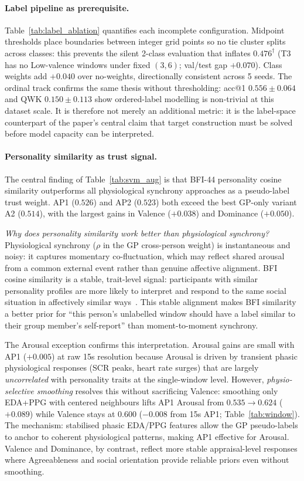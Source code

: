 \documentclass[sigconf,nonacm]{acmart}
\begin{document}
\paragraph{Label pipeline as prerequisite.}
Table~\ref{tab:label_ablation} quantifies each incomplete configuration.
Midpoint thresholds place boundaries between integer grid points so no tie
cluster splits across classes: this prevents the silent 2-class evaluation
that inflates $0.476^\dagger$ (T3 has no Low-valence windows under fixed $(3,6)$;
val/test gap $+0.070$).
Class weights add $+0.040$ over no-weights, directionally consistent across 5 seeds.
The ordinal track confirms the same thesis without thresholding: acc@1
$0.556 \pm 0.064$ and QWK $0.150 \pm 0.113$ show ordered-label modelling
is non-trivial at this dataset scale.
It is therefore not merely an additional metric: it is the label-space
counterpart of the paper's central claim that target construction must be
solved before model capacity can be interpreted.

\paragraph{Personality similarity as trust signal.}
The central finding of Table~\ref{tab:svm_aug} is that BFI-44 personality
cosine similarity outperforms all physiological synchrony approaches as a
pseudo-label trust weight.
AP1 ($0.526$) and AP2 ($0.523$) both exceed the best GP-only variant A2 ($0.514$),
with the largest gains in Valence ($+0.038$) and Dominance ($+0.050$).

\textit{Why does personality similarity work better than physiological synchrony?}
Physiological synchrony ($\rho$ in the GP cross-person weight) is instantaneous
and noisy: it captures momentary co-fluctuation, which may reflect shared arousal
from a common external event rather than genuine affective alignment.
BFI cosine similarity is a stable, trait-level signal: participants with similar
personality profiles are more likely to interpret and respond to the same social
situation in affectively similar ways~\cite{hatfield1993emotional,watson1992traits}.
This stable alignment makes BFI similarity a better prior for ``this person's
unlabelled window should have a label similar to their group member's
self-report'' than moment-to-moment synchrony.

The Arousal exception confirms this interpretation.
Arousal gains are small with AP1 ($+0.005$) at raw 15s resolution because
Arousal is driven by transient phasic physiological responses (SCR peaks, heart
rate surges) that are largely \emph{uncorrelated} with personality traits at
the single-window level.
However, \emph{physio-selective smoothing} resolves this without sacrificing
Valence: smoothing only EDA+PPG with centered neighbours lifts AP1 Arousal
from $0.535{\rightarrow}0.624$ ($+0.089$) while Valence stays at $0.600$
($-0.008$ from 15s AP1; Table~\ref{tab:window}).
The mechanism: stabilised phasic EDA/PPG features allow the GP pseudo-labels
to anchor to coherent physiological patterns, making AP1 effective for Arousal.
Valence and Dominance, by contrast, reflect more stable appraisal-level responses
where Agreeableness and social orientation provide reliable priors even without
smoothing.
\end{document}
